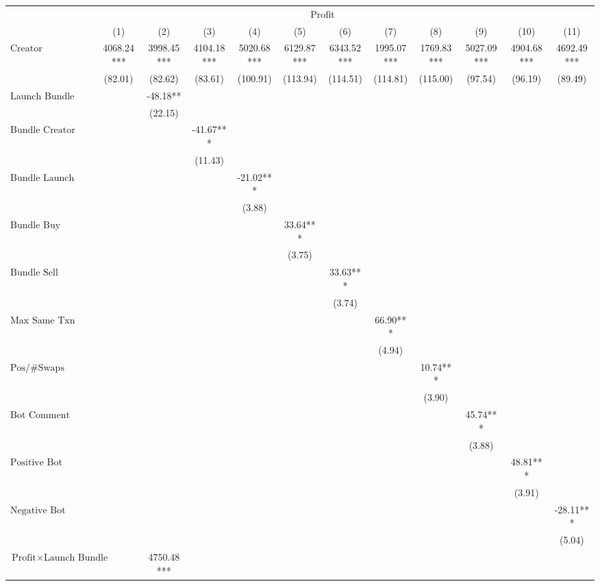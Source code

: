 \begin{tabular}{lccccccccccc}
\hline
 & \multicolumn{10}{c}{$\text{Profit}$} \\ & (1) & (2) & (3) & (4) & (5) & (6) & (7) & (8) & (9) & (10) & (11)\\
\hline
$\text{Creator}$& 4068.24*** & 3998.45*** & 4104.18*** & 5020.68*** & 6129.87*** & 6343.52*** & 1995.07*** & 1769.83*** & 5027.09*** & 4904.68*** & 4692.49*** \\
& (82.01) & (82.62) & (83.61) & (100.91) & (113.94) & (114.51) & (114.81) & (115.00) & (97.54) & (96.19) & (89.49) \\
$\text{Launch Bundle}$&  & -48.18** &  &  &  &  &  &  &  &  &  \\
&  & (22.15) &  &  &  &  &  &  &  &  &  \\
$\text{Bundle Creator Buy}$&  &  & -41.67*** &  &  &  &  &  &  &  &  \\
&  &  & (11.43) &  &  &  &  &  &  &  &  \\
$\text{Bundle Launch}$&  &  &  & -21.02*** &  &  &  &  &  &  &  \\
&  &  &  & (3.88) &  &  &  &  &  &  &  \\
$\text{Bundle Buy}$&  &  &  &  & 33.64*** &  &  &  &  &  &  \\
&  &  &  &  & (3.75) &  &  &  &  &  &  \\
$\text{Bundle Sell}$&  &  &  &  &  & 33.63*** &  &  &  &  &  \\
&  &  &  &  &  & (3.74) &  &  &  &  &  \\
$\text{Max Same Txn}$&  &  &  &  &  &  & 66.90*** &  &  &  &  \\
&  &  &  &  &  &  & (4.94) &  &  &  &  \\
$\text{Pos/\#Swaps}$&  &  &  &  &  &  &  & 10.74*** &  &  &  \\
&  &  &  &  &  &  &  & (3.90) &  &  &  \\
$\text{Bot Comment}$&  &  &  &  &  &  &  &  & 45.74*** &  &  \\
&  &  &  &  &  &  &  &  & (3.88) &  &  \\
$\text{Positive Bot Comment}$&  &  &  &  &  &  &  &  &  & 48.81*** &  \\
&  &  &  &  &  &  &  &  &  & (3.91) &  \\
$\text{Negative Bot Comment}$&  &  &  &  &  &  &  &  &  &  & -28.11*** \\
&  &  &  &  &  &  &  &  &  &  & (5.04) \\
$\text{Profit} \times \text{Launch Bundle}$&  & 4750.48*** &  &  &  &  &  &  &  &  &  \\

\end{tabular}
